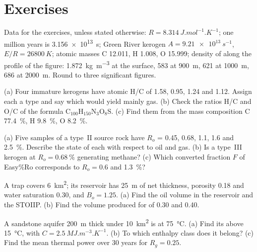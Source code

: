 \section*{Exercises}\label{sec:b2:energy-geology:exercises}

Data for the exercises, unless stated otherwise: $R = \qty{8.314}{J.mol^{-1}.K^{-1}}$; one million
years is \qty{3.156e13}{s}; Green River kerogen $A = \qty{9.21e13}{s^{-1}}$, $E/R = \qty{26800}{K}$;
atomic masses C 12.011, H 1.008, O 15.999; density of  along the profile of the figure:
\qty{1.872}{kg.m^{-3}} at the surface, 583 at \qty{900}{m}, 621 at \qty{1000}{m}, 686 at
\qty{2000}{m}. Round to three significant figures.

\begin{exercise}[$\star$]\label{exo:b2:energy-geology:1}
(a) Four immature kerogens have atomic H/C of 1.58, 0.95, 1.24 and 1.12. Assign each a type and say
which would yield mainly gas. (b) Check the ratios H/C and O/C of the formula
C$_{100}$H$_{150}$N$_3$O$_8$S. (c) Find them from the mass composition C \qty{77.4}{\percent}, H
\qty{9.8}{\percent}, O \qty{8.2}{\percent}.
\end{exercise}

\begin{exercise}[$\star$]\label{exo:b2:energy-geology:2}
(a) Five samples of a type~II source rock have $R_o$ = 0.45, 0.68, 1.1, 1.6 and \qty{2.5}{\percent}.
Describe the state of each with respect to oil and gas. (b) Is a type~III kerogen at $R_o =
\qty{0.68}{\percent}$ generating methane? (c) Which converted fraction $F$ of Easy\%Ro corresponds to
$R_o = 0.6$ and \qty{1.3}{\percent}?
\end{exercise}

\begin{exercise}[$\star$]\label{exo:b2:energy-geology:3}
A trap covers \qty{6}{km^2}; its reservoir has \qty{25}{m} of net thickness, porosity 0.18 and water
saturation 0.30, and $B_o = 1.25$. (a) Find the oil volume in the reservoir and the STOIIP. (b) Find
the volume produced for  of 0.30 and 0.40.
\end{exercise}

\begin{exercise}[$\star$]\label{exo:b2:energy-geology:4}
A sandstone aquifer \qty{200}{m} thick under \qty{10}{km^2} is at \qty{75}{\celsius}. (a) Find its
 above \qty{15}{\celsius}, with $C = \qty{2.5}{MJ.m^{-3}.K^{-1}}$. (b) To which
enthalpy class does it belong? (c) Find the mean thermal power over 30 years for $R_g = 0.25$.
\end{exercise}

